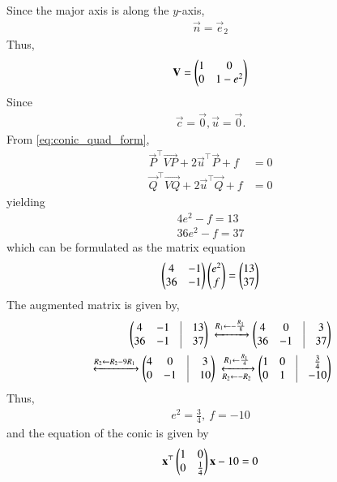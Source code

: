 Since the major axis is along the $y$-axis,
\begin{align}
\vec{n} = \vec{e}_2
\end{align}
Thus,
\begin{align}
\mathbf{V} = \begin{pmatrix}1&0\\0&1-e^2\end{pmatrix} \label{eq:chapters/11/11/3/19/5} 
\end{align}
Since
\begin{align}
\vec{c} = \vec{0}, \vec{u}=\vec{0}.
\label{eq:chapters/11/11/3/19/8}
\end{align}
    From \eqref{eq:conic_quad_form},
    \begin{align}
        \vec{P}^\top\vec{VP} + 2\vec{u}^\top\vec{P} + f &= 0 \label{eq:chapters/11/11/3/19/ep1} \\
        \vec{Q}^\top\vec{VQ} + 2\vec{u}^\top\vec{Q} + f &= 0 \label{eq:chapters/11/11/3/19/ep2}
    \end{align}
    yielding
\begin{align}
4e^2 - f = 13 \label{eq:chapters/11/11/3/19/10}
\\
36e^2 - f = 37 \label{eq:chapters/11/11/3/19/11}
\end{align}
which can be formulated as the matrix equation
\begin{align}
\begin{pmatrix}4&-1\\36&-1\end{pmatrix}\begin{pmatrix}e^2\\f\end{pmatrix} = \begin{pmatrix}13\\37\end{pmatrix}
\label{eq:chapters/11/11/3/19/12}
\end{align}
The augmented matrix is given by,
\begin{align*}
\myvec{4&-1&\vline&13\\36&-1&\vline&37}
\xleftrightarrow[]{R_1\leftarrow-\frac{R_1}{8}} \myvec{4&0&\vline&3\\36&-1&\vline&37} 
\\
\xleftrightarrow[]{R_2\leftarrow R_2-9R_1}
\myvec{4&0&\vline&3\\0&-1&\vline&10} 
\xleftrightarrow[R_2\leftarrow -R_2]{R_1\leftarrow \frac{R_1}{4}}
\myvec{1&0&\vline&\frac{3}{4}\\0&1&\vline&-10}
\end{align*}
Thus,
\begin{align}
e^2 = \frac{3}{4},\ f = -10
\end{align}
and the equation of the conic is given by
\begin{align}
\mathbf{x}^\top\begin{pmatrix}1&0\\0&\frac{1}{4}\end{pmatrix}\mathbf{x} - 10 = 0
\end{align}
